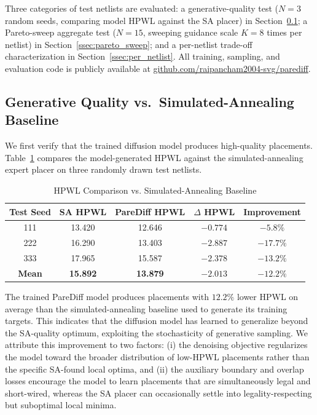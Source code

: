 \documentclass[lettersize,journal]{IEEEtran}
\begin{document}
Three categories of test netlists are evaluated: a generative-quality test ($N = 3$ random seeds, comparing model HPWL against the SA placer) in Section~\ref{ssec:hpwl_vs_sa}; a Pareto-sweep aggregate test ($N = 15$, sweeping guidance scale $K = 8$ times per netlist) in Section~\ref{ssec:pareto_sweep}; and a per-netlist trade-off characterization in Section~\ref{ssec:per_netlist}. All training, sampling, and evaluation code is publicly available at \url{github.com/raipancham2004-svg/parediff}.

\subsection{Generative Quality vs.\ Simulated-Annealing Baseline}
\label{ssec:hpwl_vs_sa}

We first verify that the trained diffusion model produces high-quality placements. Table~\ref{tab:hpwl_vs_sa} compares the model-generated HPWL against the simulated-annealing expert placer on three randomly drawn test netlists.

\begin{table}[!t]
\caption{HPWL Comparison vs. Simulated-Annealing Baseline\label{tab:hpwl_vs_sa}}
\centering
\begin{tabular}{|c|c|c|c|c|}
\hline
Test Seed & SA HPWL & PareDiff HPWL & $\Delta$ HPWL & Improvement \\
\hline
111 & 13.420 & 12.646 & $-0.774$ & $-5.8\%$ \\
\hline
222 & 16.290 & 13.403 & $-2.887$ & $-17.7\%$ \\
\hline
333 & 17.965 & 15.587 & $-2.378$ & $-13.2\%$ \\
\hline
\textbf{Mean} & \textbf{15.892} & \textbf{13.879} & $\mathbf{-2.013}$ & $\mathbf{-12.2\%}$ \\
\hline
\end{tabular}
\end{table}

The trained PareDiff model produces placements with $12.2\%$ lower HPWL on average than the simulated-annealing baseline used to generate its training targets. This indicates that the diffusion model has learned to generalize beyond the SA-quality optimum, exploiting the stochasticity of generative sampling. We attribute this improvement to two factors: (i) the denoising objective regularizes the model toward the broader distribution of low-HPWL placements rather than the specific SA-found local optima, and (ii) the auxiliary boundary and overlap losses encourage the model to learn placements that are simultaneously legal and short-wired, whereas the SA placer can occasionally settle into legality-respecting but suboptimal local minima.
\end{document}

